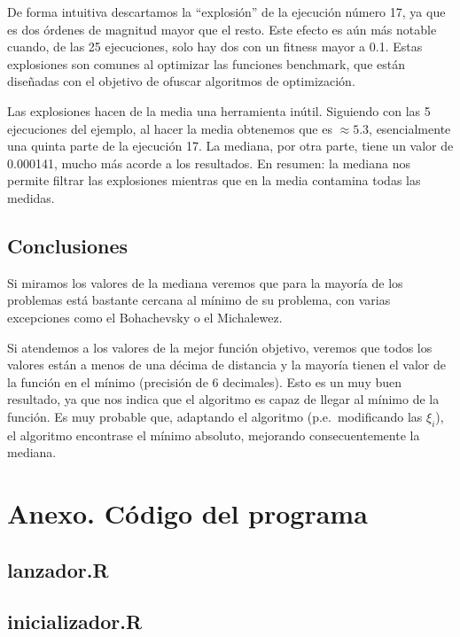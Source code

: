 \documentclass{article}
\begin{document}
De forma intuitiva descartamos la ``explosión'' de la ejecución número 17, ya que es dos órdenes de magnitud mayor que el resto. Este efecto es aún más notable cuando, de las 25 ejecuciones, solo hay dos con un fitness mayor a 0.1. Estas explosiones son comunes al optimizar las funciones benchmark, que están diseñadas con el objetivo de ofuscar algoritmos de optimización.

Las explosiones hacen de la media una herramienta inútil. Siguiendo con las 5 ejecuciones del ejemplo, al hacer la media obtenemos que es $\approx 5.3$, esencialmente una quinta parte de la ejecución 17. La mediana, por otra parte, tiene un valor de 0.000141, mucho más acorde a los resultados. En resumen: la mediana nos permite filtrar las explosiones mientras que en la media contamina todas las medidas.

\subsection{Conclusiones}
Si miramos los valores de la mediana veremos que para la mayoría de los problemas está bastante cercana al mínimo de su problema, con varias excepciones como el Bohachevsky o el Michalewez.

Si atendemos a los valores de la mejor función objetivo, veremos que todos los valores están a menos de una décima de distancia y la mayoría tienen el valor de la función en el mínimo (precisión de 6 decimales). Esto es un muy buen resultado, ya que nos indica que el algoritmo es capaz de llegar al mínimo de la función. Es muy probable que, adaptando el algoritmo (p.e.\ modificando las $\xi_i$), el algoritmo encontrase el mínimo absoluto, mejorando consecuentemente la mediana.

\vspace{5cm}

{}


\newpage

\section{Anexo. Código del programa} 

\subsection{lanzador.R}

\subsection{inicializador.R}

\end{document}
